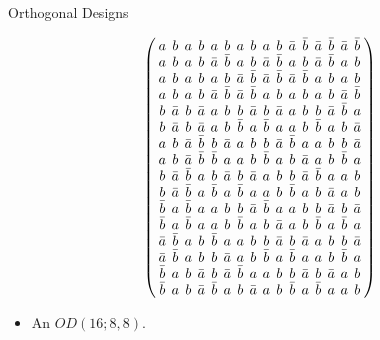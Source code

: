 \documentclass{beamer}
\begin{document}
\begin{frame}{Orthogonal Designs}

  \[
    \arraycolsep=2.0pt\def\arraystretch{0.75}
    \left(
      \begin{array}{cccccccccccccccc}
        a&b&a&b&a&b&a&b&a&b&\bar{a}&\bar{b}&\bar{a}&\bar{b}&\bar{a}&\bar{b}\\
        a&b&a&b&\bar{a}&\bar{b}&a&b&\bar{a}&\bar{b}&a&b&\bar{a}&\bar{b}&a&b\\
        a&b&a&b&a&b&\bar{a}&\bar{b}&\bar{a}&\bar{b}&\bar{a}&\bar{b}&a&b&a&b\\
        a&b&a&b&\bar{a}&\bar{b}&\bar{a}&\bar{b}&a&b&a&b&a&b&\bar{a}&\bar{b}\\
        b&\bar{a}&b&\bar{a}&a&b&b&\bar{a}&b&\bar{a}&a&b&b&\bar{a}&\bar{b}&a\\
        b&\bar{a}&b&\bar{a}&a&b&\bar{b}&a&\bar{b}&a&a&b&\bar{b}&a&b&\bar{a}\\
        a&b&\bar{a}&\bar{b}&b&\bar{a}&a&b&b&\bar{a}&\bar{b}&a&a&b&b&\bar{a}\\
        a&b&\bar{a}&\bar{b}&\bar{b}&a&a&b&\bar{b}&a&b&\bar{a}&a&b&\bar{b}&a\\
        b&\bar{a}&\bar{b}&a&b&\bar{a}&b&\bar{a}&a&b&b&\bar{a}&\bar{b}&a&a&b\\
        b&\bar{a}&\bar{b}&a&\bar{b}&a&\bar{b}&a&a&b&\bar{b}&a&b&\bar{a}&a&b\\
        \bar{b}&a&\bar{b}&a&a&b&b&\bar{a}&\bar{b}&a&a&b&b&\bar{a}&b&\bar{a}\\
        \bar{b}&a&\bar{b}&a&a&b&\bar{b}&a&b&\bar{a}&a&b&\bar{b}&a&\bar{b}&a\\
        \bar{a}&\bar{b}&a&b&\bar{b}&a&a&b&b&\bar{a}&b&\bar{a}&a&b&b&\bar{a}\\
        \bar{a}&\bar{b}&a&b&b&\bar{a}&a&b&\bar{b}&a&\bar{b}&a&a&b&\bar{b}&a\\
        \bar{b}&a&b&\bar{a}&b&\bar{a}&\bar{b}&a&a&b&b&\bar{a}&b&\bar{a}&a&b\\
        \bar{b}&a&b&\bar{a}&\bar{b}&a&b&\bar{a}&a&b&\bar{b}&a&\bar{b}&a&a&b\\
      \end{array}
    \right)
  \]

  \begin{itemize}
    \item An $OD(16;8,8)$.
  \end{itemize}
  
\end{frame}
\end{document}

